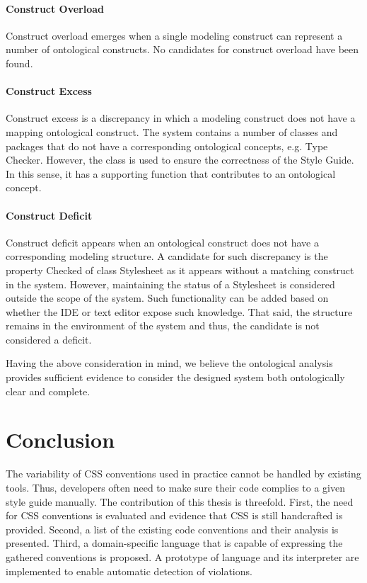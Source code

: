 \documentclass[parskip=full]{uvamscse}
\begin{document}
\subsubsection{Construct Overload}

Construct overload emerges when a single modeling construct can represent a number of ontological
constructs. No candidates for construct overload have been found.

\subsubsection{Construct Excess}

Construct excess is a discrepancy in which a modeling construct does not have a mapping ontological
construct. The system contains a number of classes and packages that do not have a corresponding
ontological concepts, e.g. Type Checker. However, the class is used to ensure the correctness of the
Style Guide. In this sense, it has a supporting function that contributes to an ontological concept.

\subsubsection{Construct Deficit}

Construct deficit appears when an ontological construct does not have a corresponding modeling
structure. A candidate for such discrepancy is the property Checked of class Stylesheet as it
appears without a matching construct in the system. However, maintaining the status of a Stylesheet
is considered outside the scope of the system. Such functionality can be added based on whether the
IDE or text editor expose such knowledge. That said, the structure remains in the environment of the
system and thus, the candidate is not considered a deficit.

Having the above consideration in mind, we believe the ontological analysis provides sufficient
evidence to consider the designed system both ontologically clear and complete.


\chapter{Conclusion}
\label{sec:conclusion}

The variability of CSS conventions used in practice cannot be handled by existing tools. Thus, developers often need to make sure their code complies to a given style guide manually. The contribution of this thesis is threefold. First, the need for CSS conventions is evaluated and
evidence that CSS is still handcrafted is provided. Second, a list of the existing code conventions
and their analysis is presented. Third, a domain-specific language that is capable of expressing the
gathered conventions is proposed. A prototype of language and its interpreter are implemented to
enable automatic detection of violations.

{%


}
\end{document}
